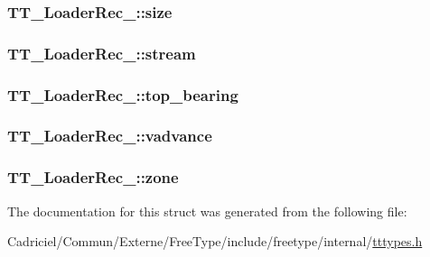\hypertarget{struct_t_t___loader_rec___a9b819b48f7c9d3efd4960700060ccefc}{
\subsubsection[{size}]{ T\-T\-\_\-\-Loader\-Rec\-\_\-\-::size}}\label{struct_t_t___loader_rec___a9b819b48f7c9d3efd4960700060ccefc}
\hypertarget{struct_t_t___loader_rec___abb44841d62cecea6dd413be951eae241}{
\subsubsection[{stream}]{ T\-T\-\_\-\-Loader\-Rec\-\_\-\-::stream}}\label{struct_t_t___loader_rec___abb44841d62cecea6dd413be951eae241}
\hypertarget{struct_t_t___loader_rec___a00c9197ba5abd4e677f116423793a9f4}{
\subsubsection[{top\-\_\-bearing}]{ T\-T\-\_\-\-Loader\-Rec\-\_\-\-::top\-\_\-bearing}}\label{struct_t_t___loader_rec___a00c9197ba5abd4e677f116423793a9f4}
\hypertarget{struct_t_t___loader_rec___aec9d10cfbe0ced3fff990bb9e936e95d}{
\subsubsection[{vadvance}]{ T\-T\-\_\-\-Loader\-Rec\-\_\-\-::vadvance}}\label{struct_t_t___loader_rec___aec9d10cfbe0ced3fff990bb9e936e95d}
\hypertarget{struct_t_t___loader_rec___aaa594deb371418c6cb932f318a8631ce}{
\subsubsection[{zone}]{ T\-T\-\_\-\-Loader\-Rec\-\_\-\-::zone}}\label{struct_t_t___loader_rec___aaa594deb371418c6cb932f318a8631ce}


The documentation for this struct was generated from the following file\-:\begin{DoxyCompactItemize}
\item 
Cadriciel/\-Commun/\-Externe/\-Free\-Type/include/freetype/internal/\hyperlink{tttypes_8h}{tttypes.\-h}\end{DoxyCompactItemize}
